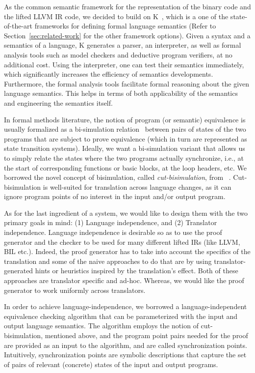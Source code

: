 As the common semantic framework for the representation of the binary code and
the lifted LLVM IR code, we decided to build on K~\cite{k-primer-2013-v32},
    which is a one of the state-of-the-art frameworks for defining formal
    language semantics (Refer to Section~\ref{sec:related-work} for the other
        framework options). Given a syntax and a semantics of a language, K
    generates a parser, an interpreter, as well as formal analysis tools such
    as model checkers and deductive program verifiers, at no additional cost.
    Using the interpreter, one can test their semantics immediately, which
    significantly increases the efficiency of semantics developments.
    Furthermore, the formal analysis tools facilitate formal reasoning about
    the given language semantics. This helps in terms of both applicability of
    the semantics and engineering the semantics itself.

In formal methods literature, the notion of program (or semantic) equivalence
is usually formalized as a bi-simulation relation~\cite{Sangiorgi:2011} between
pairs of states of the two programs that are subject to prove equivalence
(which in turn are represented as state transition systems). Ideally, we want a
bi-simulation variant that allows us to simply relate the states where the two
programs actually synchronize, i.e., at the start of corresponding functions or
basic blocks, at the loop headers, etc. We borrowed the novel concept of
bisimulation, called \emph{cut-bisimulation}, from ~\cite{}.
Cut-bisimulation is well-suited for translation  across language changes, as it
can ignore program points of no interest in the input and/or output
program.

As for the last ingredient of a \TV system, we would like to design them with
the two primary goals in mind: (1) Language independence, and (2) Translator
independence. Language independence is desirable so as to use the proof
generator and the checker to be used for   many different lifted IRs (like
    LLVM, BIL etc.). Indeed, the proof generator has to take into account the
specifics of the translation and some of the naive approaches to do that are by
using translator-generated hints or heuristics inspired by the translation's
effect.  Both of these approaches  are translator specific and ad-hoc. Whereas,
  we would like the proof generator to work uniformly across translators.

 In order to achieve language-independence, we borrowed a language-independent
 equivalence checking algorithm that can be parameterized with the input and
 output language semantics. The algorithm employs the notion of
 cut-bisimulation, mentioned above, and the program point pairs needed for the
 proof are provided as an input to the algorithm, and are called
 synchronization points. Intuitively, synchronization points are symbolic
 descriptions that capture the set of pairs of relevant (concrete) states of
 the input and output programs.

